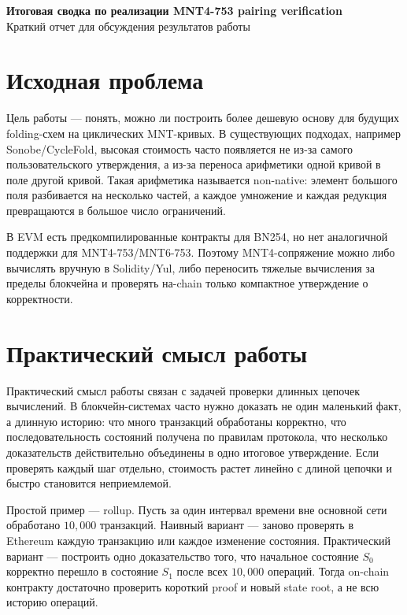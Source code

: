 \documentclass[12pt,a4paper]{article}
\begin{document}
\begin{center}
    {\Large\bfseries Итоговая сводка по реализации MNT4-753 pairing verification}\\[0.35em]
    {\normalsize Краткий отчет для обсуждения результатов работы}
\end{center}

\section{Исходная проблема}

Цель работы --- понять, можно ли построить более дешевую основу для будущих folding-схем на циклических MNT-кривых. В существующих подходах, например Sonobe/CycleFold, высокая стоимость часто появляется не из-за самого пользовательского утверждения, а из-за переноса арифметики одной кривой в поле другой кривой. Такая арифметика называется non-native: элемент большого поля разбивается на несколько частей, а каждое умножение и каждая редукция превращаются в большое число ограничений.

В EVM есть предкомпилированные контракты для BN254, но нет аналогичной поддержки для MNT4-753/MNT6-753. Поэтому MNT4-сопряжение можно либо вычислять вручную в Solidity/Yul, либо переносить тяжелые вычисления за пределы блокчейна и проверять на-chain только компактное утверждение о корректности.

\section{Практический смысл работы}

Практический смысл работы связан с задачей проверки длинных цепочек вычислений. В блокчейн-системах часто нужно доказать не один маленький факт, а длинную историю: что много транзакций обработаны корректно, что последовательность состояний получена по правилам протокола, что несколько доказательств действительно объединены в одно итоговое утверждение. Если проверять каждый шаг отдельно, стоимость растет линейно с длиной цепочки и быстро становится неприемлемой.

Простой пример --- rollup. Пусть за один интервал времени вне основной сети обработано \(10{,}000\) транзакций. Наивный вариант --- заново проверять в Ethereum каждую транзакцию или каждое изменение состояния. Практический вариант --- построить одно доказательство того, что начальное состояние \(S_0\) корректно перешло в состояние \(S_1\) после всех \(10{,}000\) операций. Тогда on-chain контракту достаточно проверить короткий proof и новый state root, а не всю историю операций.
\end{document}

